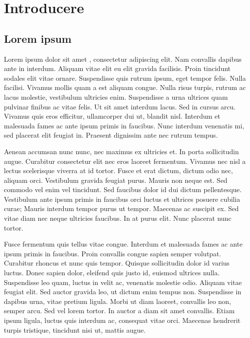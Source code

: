 \chapter{Introducere}

\section{Lorem ipsum}

Lorem ipsum dolor sit amet \cite{fake_citation}, consectetur adipiscing elit. Nam convallis dapibus ante in interdum. Aliquam vitae elit eu elit gravida facilisis. Proin tincidunt sodales elit vitae ornare. Suspendisse quis rutrum ipsum, eget tempor felis. Nulla facilisi. Vivamus mollis quam a est aliquam congue. Nulla risus turpis, rutrum ac lacus molestie, vestibulum ultricies enim. Suspendisse a urna ultrices quam pulvinar finibus ac vitae felis. Ut sit amet interdum lacus. Sed in cursus arcu. Vivamus quis eros efficitur, ullamcorper dui ut, blandit nisl. Interdum et malesuada fames ac ante ipsum primis in faucibus. Nunc interdum venenatis mi, sed placerat elit feugiat in. Praesent dignissim ante nec rutrum tempus.

Aenean accumsan nunc nunc, nec maximus ex ultricies et. In porta sollicitudin augue. Curabitur consectetur elit nec eros laoreet fermentum. Vivamus nec nisl a lectus scelerisque viverra at id tortor. Fusce et erat dictum, dictum odio nec, aliquam orci. Vestibulum gravida feugiat purus. Mauris non neque est. Sed commodo vel enim vel tincidunt. Sed faucibus dolor id dui dictum pellentesque. Vestibulum ante ipsum primis in faucibus orci luctus et ultrices posuere cubilia curae; Mauris interdum tempor purus ut tempor. Maecenas ac suscipit ex. Sed vitae diam nec neque ultricies faucibus. In at purus elit. Nunc placerat nunc tortor.

Fusce fermentum quis tellus vitae congue. Interdum et malesuada fames ac ante ipsum primis in faucibus. Proin convallis congue sapien semper volutpat. Curabitur rhoncus et nunc quis tempor. Quisque sollicitudin dolor id varius luctus. Donec sapien dolor, eleifend quis justo id, euismod ultrices nulla. Suspendisse leo quam, luctus in velit ac, venenatis molestie odio. Aliquam vitae feugiat elit. Sed auctor gravida leo, ut dictum enim tempus non. Suspendisse in dapibus urna, vitae pretium ligula. Morbi ut diam laoreet, convallis leo non, semper arcu. Sed vel lorem tortor. In auctor a diam sit amet convallis. Etiam ipsum ligula, luctus quis interdum ac, consequat vitae orci. Maecenas hendrerit turpis tristique, tincidunt nisi ut, mattis augue.


